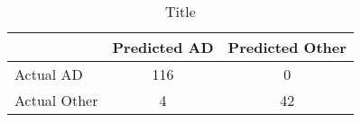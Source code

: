 \begin{table}[h]
\centering
\begin{tabular}{l|cc}
 & Predicted AD & Predicted Other \\ \hline
Actual AD & 116 & 0 \\
Actual Other & 4 & 42 \\
\end{tabular}
\caption{Title}
\end{table}
